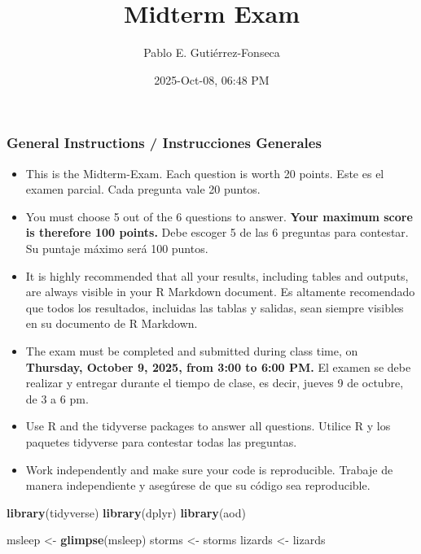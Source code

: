 \documentclass[
]{article}
\title{Midterm Exam}
\author{Pablo E. Gutiérrez-Fonseca}
\date{2025-Oct-08, 06:48 PM}
\newenvironment{Shaded}{\begin{snugshade}}{\end{snugshade}}
\newcommand{\FunctionTok}[1]{\textcolor[rgb]{0.13,0.29,0.53}{\textbf{#1}}}
\newcommand{\NormalTok}[1]{#1}
\newcommand{\OtherTok}[1]{\textcolor[rgb]{0.56,0.35,0.01}{#1}}
\begin{document}
\maketitle

\subsubsection{General Instructions / Instrucciones
Generales}\label{general-instructions-instrucciones-generales}

\begin{itemize}
\item
  This is the Midterm-Exam. Each question is worth 20 points. Este es el
  examen parcial. Cada pregunta vale 20 puntos.
\item
  You must choose 5 out of the 6 questions to answer. \textbf{Your
  maximum score is therefore 100 points.} Debe escoger 5 de las 6
  preguntas para contestar. Su puntaje máximo será 100 puntos.
\item
  It is highly recommended that all your results, including tables and
  outputs, are always visible in your R Markdown document. Es altamente
  recomendado que todos los resultados, incluidas las tablas y salidas,
  sean siempre visibles en su documento de R Markdown.
\item
  The exam must be completed and submitted during class time, on
  \textbf{Thursday, October 9, 2025, from 3:00 to 6:00 PM.} El examen se
  debe realizar y entregar durante el tiempo de clase, es decir, jueves
  9 de octubre, de 3 a 6 pm.
\item
  Use R and the tidyverse packages to answer all questions. Utilice R y
  los paquetes tidyverse para contestar todas las preguntas.
\item
  Work independently and make sure your code is reproducible. Trabaje de
  manera independiente y asegúrese de que su código sea reproducible.
\end{itemize}

\begin{Shaded}
\begin{Highlighting}[]
\FunctionTok{library}\NormalTok{(tidyverse)}
\FunctionTok{library}\NormalTok{(dplyr)}
\FunctionTok{library}\NormalTok{(aod)}
\end{Highlighting}
\end{Shaded}

\begin{Shaded}
\begin{Highlighting}[]
\NormalTok{msleep }\OtherTok{\textless{}{-}} \FunctionTok{glimpse}\NormalTok{(msleep)}
\NormalTok{storms }\OtherTok{\textless{}{-}}\NormalTok{ storms}
\NormalTok{lizards }\OtherTok{\textless{}{-}}\NormalTok{ lizards}
\end{Highlighting}
\end{Shaded}
\end{document}
